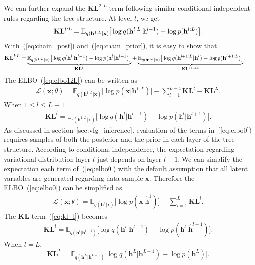 \documentclass{article}
\begin{document}
We can further expand the $\mathbf{KL}^{2:L}$ term following similar conditional independent rules regarding the tree structure.
At level $l$, we get
$$\textbf{\text{KL}}^{l:L} 
= \mathbb{E}_{q(\mathbf{h}^{1:L}|\mathbf{x})}\big[  \log q(\mathbf{h}^{l:L}|\mathbf{h}^{l-1})- \log p(\mathbf{h}^{l:L})  \big].$$
With~(\ref{eq:chain_post}) and~(\ref{eq:chain_prior}), it is easy to show that
 \begin{align} \label{eq:kl_lL}
\textbf{\text{KL}}^{l:L} 
=&  \underbrace{\mathbb{E}_{q(\mathbf{h}^{1:L}|\mathbf{x})}\big[  \log q(\mathbf{h}^{l}|\mathbf{h}^{l-1})   - \log p(\mathbf{h}^{l}|\mathbf{h}^{l+1}) \big]}_{\mathbf{KL}^l} + \underbrace{\mathbb{E}_{q(\mathbf{h}^{l:L}|\mathbf{x})}\big[  \log q(\mathbf{h}^{l+1:L}|\mathbf{h}^{l})- \log p(\mathbf{h}^{l+1:L})  \big]}_{\mathbf{KL}^{l+1:L}}.
\end{align}
The ELBO~(\ref{eq:elbo12L}) can be written as 
 \begin{align} \label{eq:elbo0}
\mathcal{L}(\mathbf{x}; \theta) = \mathbb{E}_{q(\mathbf{h}^{1:L}|\mathbf{x})}\big[ \log p(\mathbf{x}|\mathbf{h}^{1:L})  \big] - \sum_{l=1}^{L-1} \mathbf{KL}^l -\mathbf{KL}^L.
\end{align}
When $1\leqslant l \leqslant L-1$
 \begin{align} \label{eq:kl_l}
 \mathbf{KL}^l=\mathbb{E}_{q(\mathbf{h}^{1:L}|\mathbf{x})}\big[  \log q(\mathbf{h}^{l}|\mathbf{h}^{l-1})   - \log p(\mathbf{h}^{l}|\mathbf{h}^{l+1}) \big].
 \end{align}
As discussed in section~\ref{sec:vfg_inference}, evaluation of the terms in~(\ref{eq:elbo0}) requires samples of both the posterior and the prior in each layer of the tree structure. According to conditional independence, the expectation regarding variational distribution layer $l$ just depends on layer $l-1$. We can simplify the expectation each term of~(\ref{eq:elbo0}) with the default assumption that all latent variables are generated regarding data sample $\mathbf{x}$.  Therefore the ELBO~(\ref{eq:elbo0}) can be simplified as 
 \begin{align} \label{eq:elbo1}
\mathcal{L}(\mathbf{x}; \theta) = \mathbb{E}_{q(\mathbf{h}^{1}|\mathbf{x})}\big[ \log p(\mathbf{x}|\widehat{\mathbf{h}}^{1})  \big] - \sum_{l=1}^{L} \mathbf{KL}^l.
\end{align}
The $\mathbf{KL}$ term~(\ref{eq:kl_l}) becomes
\begin{align*}
 \mathbf{KL}^l=\mathbb{E}_{q(\mathbf{h}^{l}|\mathbf{h}^{l-1})}\big[  \log q(\mathbf{h}^{l}|\mathbf{h}^{l-1})   - \log p(\mathbf{h}^{l}|\widehat{\mathbf{h}}^{l+1}) \big].
 \end{align*}
When $l=L$, 
$$\mathbf{KL}^L =  \mathbb{E}_{q(\mathbf{h}^{L}|\mathbf{h}^{L-1})}\big[  \log q(\mathbf{h}^{L}|\mathbf{h}^{L-1})- \log p(\mathbf{h}^{L})  \big].$$
\end{document}

